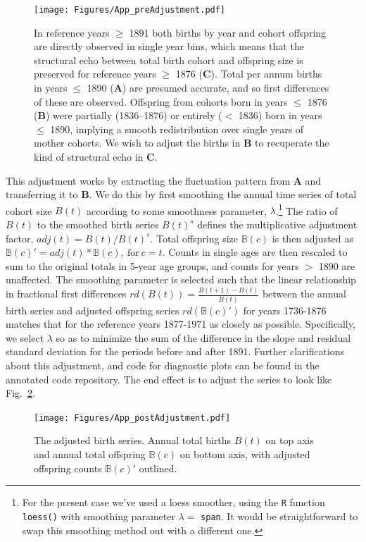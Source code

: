 \begin{figure}[ht!]
\centering
\texttt{[image: Figures/App\_preAdjustment.pdf]}
\caption{In reference years $\ge$ 1891 both births by year and cohort offspring are directly observed in single year bins, which means that the structural echo between total birth cohort and offspring size is preserved for reference years $\ge$ 1876  (\textbf{C}). Total per annum births in years $\le$ 1890 (\textbf{A}) are presumed accurate, and so first differences of these are observed. Offspring from cohorts born in years $\le$ 1876 (\textbf{B}) were partially (1836--1876) or entirely ($<$ 1836) born in years $\le$ 1890, implying a smooth redistribution over single years of mother cohorts. We wish to adjust the births in \textbf{B} to recuperate the kind of structural echo in \textbf{C}.}
\label{fig:toosmooth}
\end{figure}

This adjustment works by extracting the fluctuation pattern from \textbf{A} and transferring it to \textbf{B}. We do this by first smoothing the annual time series of total cohort size $B(t)$ according to some smoothness parameter, $\lambda$.\footnote{For the present case we've used a loess smoother, using the \texttt{R} function \texttt{loess()} with smoothing parameter $\lambda =$ \texttt{span}. It would be straightforward to swap this smoothing method out with a different one.} The ratio of $B(t)$ to the smoothed birth series $B(t)^s$ defines the multiplicative adjustment factor, $adj(t) = B(t)/B(t)^s$. Total offspring size $\mathbb{B}(c)$ is then adjusted as $\mathbb{B}(c)' = adj(t)*\mathbb{B}(c), \mathrm{~for~} c = t$. Counts in single ages are then rescaled to sum to the original totals in 5-year age groups, and counts for years $>$ 1890 are unaffected. The smoothing parameter is selected such that the linear relationship in fractional first differences $rd(B(t)) = \frac{B(t+1)-B(t)}{B(t)}$ between the annual birth series and adjusted offspring series $rd(\mathbb{B}(c)')$ for years 1736-1876 matches that for the reference years 1877-1971 as closely as possible. Specifically, we select $\lambda$ so as to minimize the sum of the difference in the slope and residual standard deviation for the periods before and after 1891. Further clarifications about this adjustment, and code for diagnostic plots can be found in the annotated code repository. The end effect is to adjust the series to look like Fig.~\ref{fig:better}.
					
					\begin{figure}[ht!]
					\centering
					\texttt{[image: Figures/App\_postAdjustment.pdf]}
					\caption{The adjusted birth series. Annual total births $B(t)$ on top axis and annual total offspring $\mathbb{B}(c)$ on bottom axis, with adjusted offspring counts $\mathbb{B}(c)'$ outlined.}
\label{fig:better}
\end{figure}


